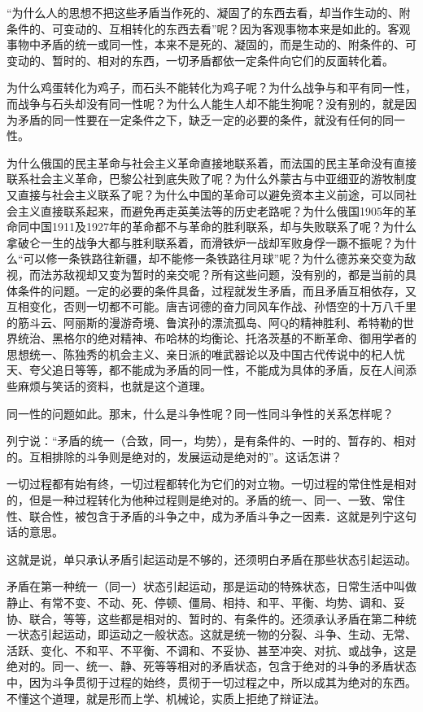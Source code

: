 “为什么人的思想不把这些矛盾当作死的、凝固了的东西去看，却当作生动的、附条件的、可变动的、互相转化的东西去看”呢？因为客观事物本来是如此的。客观事物中矛盾的统一或同一性，本来不是死的、凝固的，而是生动的、附条件的、可变动的、暂时的、相对的东西，一切矛盾都依一定条件向它们的反面转化着。

为什么鸡蛋转化为鸡子，而石头不能转化为鸡子呢？为什么战争与和平有同一性，而战争与石头却没有同一性呢？为什么人能生人却不能生狗呢？没有别的，就是因为矛盾的同一性要在一定条件之下，缺乏一定的必要的条件，就没有任何的同一性。

为什么俄国的民主革命与社会主义革命直接地联系着，而法国的民主革命没有直接联系社会主义革命，巴黎公社到底失败了呢？为什么外蒙古与中亚细亚的游牧制度又直接与社会主义联系了呢？为什么中国的革命可以避免资本主义前途，可以同社会主义直接联系起来，而避免再走英美法等的历史老路呢？为什么俄国1905年的革命同中国1911及1927年的革命都不与革命的胜利联系，却与失败联系了呢？为什么拿破仑一生的战争大都与胜利联系着，而滑铁炉一战却军败身俘一蹶不振呢？为什么“可以修一条铁路往新疆，却不能修一条铁路往月球”呢？为什么德苏亲交变为敌视，而法苏敌视却又变为暂时的亲交呢？所有这些问题，没有别的，都是当前的具体条件的问题。一定的必要的条件具备，过程就发生矛盾，而且矛盾互相依存，又互相变化，否则一切都不可能。唐吉诃德的奋力同风车作战、孙悟空的十万八千里的筋斗云、阿丽斯的漫游奇境、鲁滨孙的漂流孤岛、阿Q的精神胜利、希特勒的世界统治、黑格尔的绝对精神、布哈林的均衡论、托洛茨基的不断革命、御用学者的思想统一、陈独秀的机会主义、亲日派的唯武器论以及中国古代传说中的杞人忧天、夸父追日等等，都不能成为矛盾的同一性，不能成为具体的矛盾，反在人间添些麻烦与笑话的资料，也就是这个道理。

同一性的问题如此。那末，什么是斗争性呢？同一性同斗争性的关系怎样呢？

列宁说：“矛盾的统一（合致，同一，均势），是有条件的、一时的、暂存的、相对的。互相排除的斗争则是绝对的，发展运动是绝对的”。这话怎讲？

一切过程都有始有终，一切过程都转化为它们的对立物。一切过程的常住性是相对的，但是一种过程转化为他种过程则是绝对的。矛盾的统一、同一、一致、常住性、联合性，被包含于矛盾的斗争之中，成为矛盾斗争之一因素．这就是列宁这句话的意思。

这就是说，单只承认矛盾引起运动是不够的，还须明白矛盾在那些状态引起运动。

矛盾在第一种统一（同一）状态引起运动，那是运动的特殊状态，日常生活中叫做静止、有常不变、不动、死、停顿、僵局、相持、和平、平衡、均势、调和、妥协、联合，等等，这些都是相对的、暂时的、有条件的。还须承认矛盾在第二种统一状态引起运动，即运动之一般状态。这就是统一物的分裂、斗争、生动、无常、活跃、变化、不和平、不平衡、不调和、不妥协、甚至冲突、对抗、或战争，这是绝对的。同一、统一、静、死等等相对的矛盾状态，包含于绝对的斗争的矛盾状态中，因为斗争贯彻于过程的始终，贯彻于一切过程之中，所以成其为绝对的东西。不懂这个道理，就是形而上学、机械论，实质上拒绝了辩证法。

